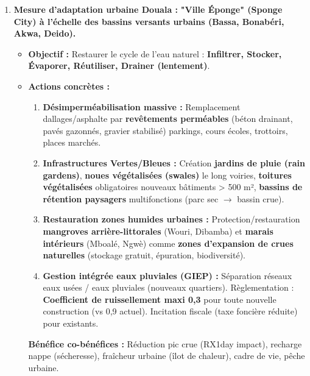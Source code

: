 \documentclass[11pt]{article}
\begin{document}
\begin{exoresolu}
\begin{enumerate}
\begin{itemize}
          \end{itemize}
    \item \textbf{Mesure d'adaptation urbaine Douala :}
          \textbf{"Ville Éponge" (Sponge City) à l'échelle des bassins versants urbains (Bassa, Bonabéri, Akwa, Deido).}
          \begin{itemize}
              \item \textbf{Objectif :} Restaurer le cycle de l'eau naturel : \textbf{Infiltrer, Stocker, Évaporer, Réutiliser, Drainer (lentement)}.
              \item \textbf{Actions concrètes :}
                  \begin{enumerate}
                      \item \textbf{Désimperméabilisation massive :} Remplacement dallages/asphalte par \textbf{revêtements perméables} (béton drainant, pavés gazonnés, gravier stabilisé) parkings, cours écoles, trottoirs, places marchés.
                      \item \textbf{Infrastructures Vertes/Bleues :} Création \textbf{jardins de pluie (rain gardens)}, \textbf{noues végétalisées (swales)} le long voiries, \textbf{toitures végétalisées} obligatoires nouveaux bâtiments > 500 m², \textbf{bassins de rétention paysagers} multifonctions (parc sec $\rightarrow$ bassin crue).
                      \item \textbf{Restauration zones humides urbaines :} Protection/restauration \textbf{mangroves arrière-littorales} (Wouri, Dibamba) et \textbf{marais intérieurs} (Mboalé, Ngwè) comme \textbf{zones d'expansion de crues naturelles} (stockage gratuit, épuration, biodiversité).
                      \item \textbf{Gestion intégrée eaux pluviales (GIEP) :} Séparation réseaux eaux usées / eaux pluviales (nouveaux quartiers). Règlementation : \textbf{Coefficient de ruissellement maxi 0,3} pour toute nouvelle construction (vs 0,9 actuel). Incitation fiscale (taxe foncière réduite) pour existants.
                  \end{enumerate}
                  \textbf{Bénéfice co-bénéfices :} Réduction pic crue (RX1day impact), recharge nappe (sécheresse), fraîcheur urbaine (îlot de chaleur), cadre de vie, pêche urbaine.
          \end{itemize}
\end{enumerate}
\end{exoresolu}
\end{document}
